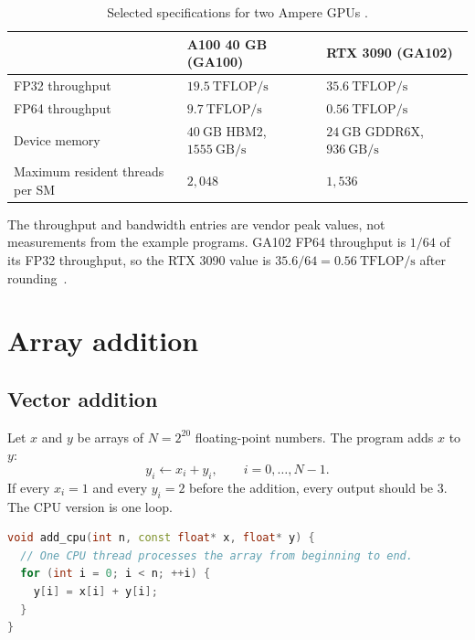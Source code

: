 \documentclass[11pt]{article}
\numberwithin{equation}{section}
\numberwithin{figure}{section}
\numberwithin{table}{section}
\begin{document}
\begin{table}[htbp]
  \centering
  \small
  \caption{Selected specifications for two Ampere GPUs
  \cite{ampere2020,ga102whitepaper,rtx3090specs,cuda-programming-guide}.}
  \label{tab:a100-3090}
  \begin{tabularx}{\textwidth}{@{}>{\raggedright\arraybackslash}p{}YY@{}}
    \toprule
    & A100 40 GB (GA100) & RTX 3090 (GA102) \\
    \midrule
    FP32 throughput
      & $19.5\ \mathrm{TFLOP/s}$
      & $35.6\ \mathrm{TFLOP/s}$ \\
    FP64 throughput
      & $9.7\ \mathrm{TFLOP/s}$
      & $0.56\ \mathrm{TFLOP/s}$ \\
    Device memory
      & $40\ \mathrm{GB}$ HBM2, $1555\ \mathrm{GB/s}$
      & $24\ \mathrm{GB}$ GDDR6X, $936\ \mathrm{GB/s}$ \\
    Maximum resident threads per SM
      & $2{,}048$
      & $1{,}536$ \\
    \bottomrule
  \end{tabularx}
\end{table}
\FloatBarrier

The throughput and bandwidth entries are vendor peak values, not measurements from
the example programs.  GA102 FP64 throughput is $1/64$ of its FP32 throughput, so
the RTX 3090 value is $35.6/64=0.56\ \mathrm{TFLOP/s}$ after
rounding~\cite{ga102whitepaper}.

\newpage
\section{Array addition}

\subsection{Vector addition}
\label{chap:vector-add}

Let \(x\) and \(y\) be arrays of \(N=2^{20}\) floating-point numbers.  The program
adds \(x\) to \(y\):
\begin{equation}
  y_i \leftarrow x_i+y_i,
  \qquad i=0,\ldots,N-1.
  \label{eq:vector-add}
\end{equation}
If every \(x_i=1\) and every \(y_i=2\) before the addition, every output should be
3.  The CPU version is one loop.
\begin{lstlisting}[language=C++,caption={Serial CPU addition.}]
void add_cpu(int n, const float* x, float* y) {
  // One CPU thread processes the array from beginning to end.
  for (int i = 0; i < n; ++i) {
    y[i] = x[i] + y[i];
  }
}
\end{lstlisting}
\end{document}

